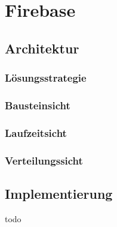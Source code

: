 \chapter{Firebase}

\section{Architektur}

\subsection{Lösungsstrategie}

\subsection{Bausteinsicht}

\subsection{Laufzeitsicht}

\subsection{Verteilungssicht}

\section{Implementierung}

todo